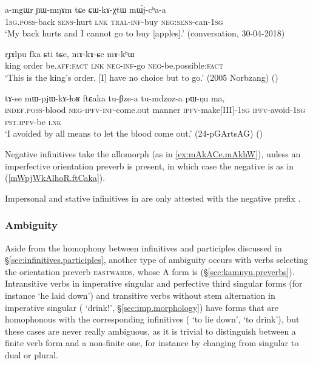 \begin{exe}
\ex \label{ex:CWkAXtW}
\gll a-mgɯr ɲɯ-mŋɤm tɕe ɕɯ-kɤ-χtɯ mɯ́j-cʰa-a \\
\textsc{1sg}.\textsc{poss}-back \textsc{sens}-hurt \textsc{lnk} \textsc{tral}-\textsc{inf}-buy \textsc{neg}:\textsc{sens}-can-\textsc{1sg} \\
\glt `My back hurts and I cannot go to  buy [apples].' (conversation, 30-04-2018)
\end{exe}
 
\begin{exe}
\ex \label{ex:mAkACe.mAkhW}
\gll   rɟɤlpu fka ɕti tɕe, mɤ-kɤ-ɕe mɤ-kʰɯ \\
king order be.\textsc{aff}:\textsc{fact} \textsc{lnk} \textsc{neg}-\textsc{inf}-go \textsc{neg}-be.possible:\textsc{fact} \\
\glt `This is the king's order, [I] have no choice but to go.' (2005 Norbzang)
()
\end{exe}
 
\begin{exe}
\ex \label{mWpjWkAlhoR.ftCaka}
 \gll  tɤ-se mɯ-pjɯ-kɤ-ɬoʁ ftɕaka tu-βze-a tu-mdzoz-a pɯ-ŋu ma, \\
 \textsc{indef}.\textsc{poss}-blood \textsc{neg}-\textsc{ipfv}-\textsc{inf}-come.out manner \textsc{ipfv}-make[III]-\textsc{1sg} \textsc{ipfv}-avoid-\textsc{1sg} \textsc{pst}.\textsc{ipfv}-be \textsc{lnk} \\
\glt `I avoided by all means to let the blood come out.' (24-pGArtsAG) ()
 \end{exe}
 
Negative infinitives take the allomorph  (as in \ref{ex:mAkACe.mAkhW}), unless an imperfective orientation preverb is present, in which case the negative is  as in (\ref{mWpjWkAlhoR.ftCaka}).

Impersonal and stative infinitives in  are only attested with the negative prefix .

\subsubsection{Ambiguity}  \label{sec:velar.inf.ambiguity}
Aside from the homophony between infinitives and participles discussed in §\ref{sec:infinitives.participles}, another type of ambiguity occurs with verbs selecting the orientation preverb \textsc{eastwards}, whose A form is  (§\ref{sec:kamnyu.preverbs}). Intransitive verbs in imperative singular and perfective third singular forms (for instance  `he laid down') and transitive verbs without stem alternation in imperative singular ( `drink!', §\ref{sec:imp.morphology}) have forms that are homophonous with the corresponding infinitives ( `to lie down',  `to drink'), but these cases are never really ambiguous, as it is trivial to distinguish between a finite verb form and a non-finite one, for instance by changing from singular to dual or plural. 

